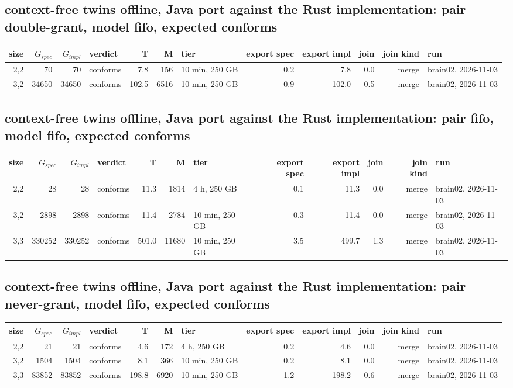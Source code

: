 \documentclass[10pt]{article}
\begin{document}
\subsection*{context-free twins offline, Java port against the Rust implementation: pair \textsf{double-grant}, model fifo, expected conforms}
\begin{longtable}{@{}rrrlrrlrrrrl@{}}
\toprule
size & $G_{\mathit{spec}}$ & $G_{\mathit{impl}}$ & verdict & T & M & tier & export spec & export impl & join & join kind & run \\
\midrule
\endhead
\color{blue} 2,2 & 70 & 70 & conforms & 7.8 & 156 & 10 min, 250 GB & 0.2 & 7.8 & 0.0 & merge & brain02, 2026-11-03 \\
\color{blue} 3,2 & 34650 & 34650 & conforms & 102.5 & 6516 & 10 min, 250 GB & 0.9 & 102.0 & 0.5 & merge & brain02, 2026-11-03 \\
\bottomrule
\end{longtable}
\subsection*{context-free twins offline, Java port against the Rust implementation: pair \textsf{fifo}, model fifo, expected conforms}
\begin{longtable}{@{}rrrlrrlrrrrl@{}}
\toprule
size & $G_{\mathit{spec}}$ & $G_{\mathit{impl}}$ & verdict & T & M & tier & export spec & export impl & join & join kind & run \\
\midrule
\endhead
\color{blue} 2,2 & 28 & 28 & conforms & 11.3 & 1814 & 4 h, 250 GB & 0.1 & 11.3 & 0.0 & merge & brain02, 2026-11-03 \\
\color{blue} 3,2 & 2898 & 2898 & conforms & 11.4 & 2784 & 10 min, 250 GB & 0.3 & 11.4 & 0.0 & merge & brain02, 2026-11-03 \\
\color{blue} 3,3 & 330252 & 330252 & conforms & 501.0 & 11680 & 10 min, 250 GB & 3.5 & 499.7 & 1.3 & merge & brain02, 2026-11-03 \\
\bottomrule
\end{longtable}
\subsection*{context-free twins offline, Java port against the Rust implementation: pair \textsf{never-grant}, model fifo, expected conforms}
\begin{longtable}{@{}rrrlrrlrrrrl@{}}
\toprule
size & $G_{\mathit{spec}}$ & $G_{\mathit{impl}}$ & verdict & T & M & tier & export spec & export impl & join & join kind & run \\
\midrule
\endhead
\color{blue} 2,2 & 21 & 21 & conforms & 4.6 & 172 & 4 h, 250 GB & 0.2 & 4.6 & 0.0 & merge & brain02, 2026-11-03 \\
\color{blue} 3,2 & 1504 & 1504 & conforms & 8.1 & 366 & 10 min, 250 GB & 0.2 & 8.1 & 0.0 & merge & brain02, 2026-11-03 \\
\color{blue} 3,3 & 83852 & 83852 & conforms & 198.8 & 6920 & 10 min, 250 GB & 1.2 & 198.2 & 0.6 & merge & brain02, 2026-11-03 \\
\bottomrule
\end{longtable}
\end{document}
